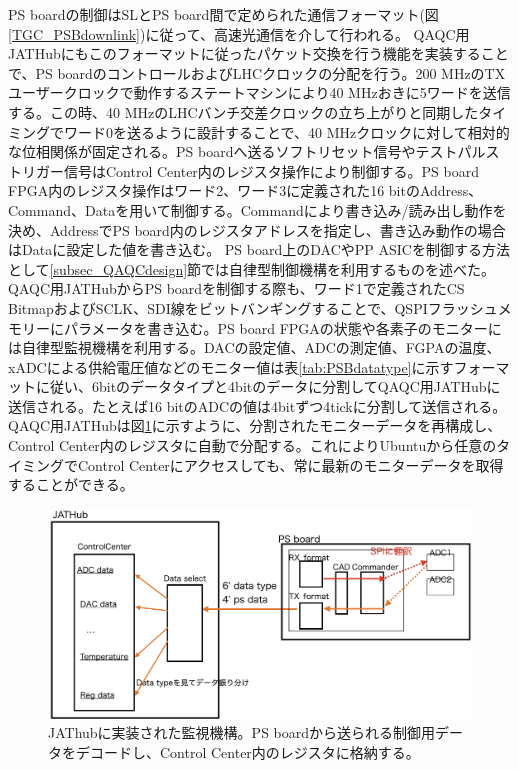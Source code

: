 PS boardの制御はSLとPS board間で定められた通信フォーマット(図\ref{TGC_PSBdownlink})に従って、高速光通信を介して行われる。
QAQC用JATHubにもこのフォーマットに従ったパケット交換を行う機能を実装することで、PS boardのコントロールおよびLHCクロックの分配を行う。200 MHzのTXユーザークロックで動作するステートマシンにより40 MHzおきに5ワードを送信する。この時、40 MHzのLHCバンチ交差クロックの立ち上がりと同期したタイミングでワード0を送るように設計することで、40 MHzクロックに対して相対的な位相関係が固定される。PS boardへ送るソフトリセット信号やテストパルストリガー信号はControl Center内のレジスタ操作により制御する。PS board FPGA内のレジスタ操作はワード2、ワード3に定義された16 bitのAddress、Command、Dataを用いて制御する。Commandにより書き込み/読み出し動作を決め、AddressでPS board内のレジスタアドレスを指定し、書き込み動作の場合はDataに設定した値を書き込む。
PS board上のDACやPP ASICを制御する方法として\ref{subsec_QAQCdesign}節では自律型制御機構を利用するものを述べた。QAQC用JATHubからPS boardを制御する際も、ワード1で定義されたCS BitmapおよびSCLK、SDI線をビットバンギングすることで、QSPIフラッシュメモリーにパラメータを書き込む。PS board FPGAの状態や各素子のモニターには自律型監視機構を利用する。DACの設定値、ADCの測定値、FGPAの温度、xADCによる供給電圧値などのモニター値は表\ref{tab:PSBdatatype}に示すフォーマットに従い、6bitのデータタイプと4bitのデータに分割してQAQC用JATHubに送信される。たとえば16 bitのADCの値は4bitずつ4tickに分割して送信される。QAQC用JATHubは図\ref{JATHubmonitor}に示すように、分割されたモニターデータを再構成し、Control Center内のレジスタに自動で分配する。これによりUbuntuから任意のタイミングでControl Centerにアクセスしても、常に最新のモニターデータを取得することができる。
\baselineskip

\begin{figure} 
\centering
\includegraphics[width=16cm]{fig/QAQC/JATHubmonitor.png}
\caption[JAThubに実装された監視機構]{JAThubに実装された監視機構。PS boardから送られる制御用データをデコードし、Control Center内のレジスタに格納する。}
\label{JATHubmonitor}
\end{figure}


